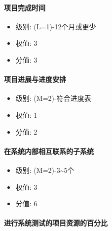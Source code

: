 \documentclass[hyperref, a4paper]{ctexart}
\providecommand{\tightlist}{%
  \setlength{\itemsep}{0pt}\setlength{\parskip}{0pt}}
\let\oldparagraph\paragraph
\renewcommand{\paragraph}[1]{\oldparagraph{#1}\mbox{}}
\begin{document}
\hypertarget{ux9879ux76eeux5b8cux6210ux65f6ux95f4}{%
\paragraph{项目完成时间}\label{ux9879ux76eeux5b8cux6210ux65f6ux95f4}}

\begin{itemize}
\tightlist
\item
  级别: (L=1)-12个月或更少
\item
  权值: 3
\item
  分值: 3
\end{itemize}

\hypertarget{ux9879ux76eeux8fdbux5c55ux4e0eux8fdbux5ea6ux5b89ux6392}{%
\paragraph{项目进展与进度安排}\label{ux9879ux76eeux8fdbux5c55ux4e0eux8fdbux5ea6ux5b89ux6392}}

\begin{itemize}
\tightlist
\item
  级别: (M=2)-符合进度表
\item
  权值: 1
\item
  分值: 2
\end{itemize}

\hypertarget{ux5728ux7cfbux7edfux5185ux90e8ux76f8ux4e92ux8054ux7cfbux7684ux5b50ux7cfbux7edf}{%
\paragraph{在系统内部相互联系的子系统}\label{ux5728ux7cfbux7edfux5185ux90e8ux76f8ux4e92ux8054ux7cfbux7684ux5b50ux7cfbux7edf}}

\begin{itemize}
\tightlist
\item
  级别: (M=2)-3\textasciitilde5个
\item
  权值: 3
\item
  分值: 6
\end{itemize}

\hypertarget{ux8fdbux884cux7cfbux7edfux6d4bux8bd5ux7684ux9879ux76eeux8d44ux6e90ux7684ux767eux5206ux6bd4}{%
\paragraph{进行系统测试的项目资源的百分比}\label{ux8fdbux884cux7cfbux7edfux6d4bux8bd5ux7684ux9879ux76eeux8d44ux6e90ux7684ux767eux5206ux6bd4}}
\end{document}

